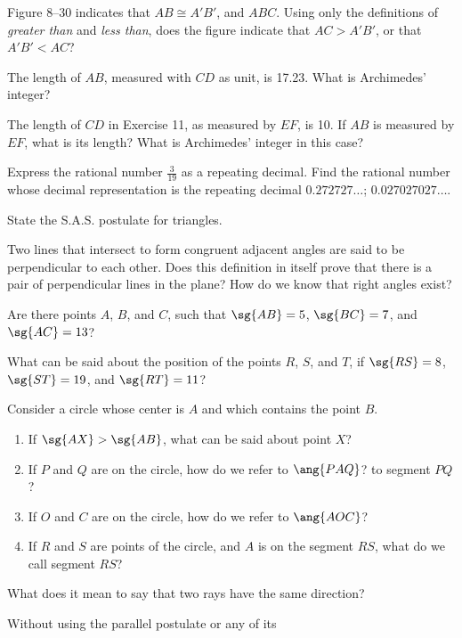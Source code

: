 \documentclass[11pt]{book}
\theoremstyle{bkplain}
\theoremstyle{XIplainnote}
\theoremstyle{bkplain}
\theoremstyle{bkplain}
\begin{document}
\begin{exlist}
\item[10.] Figure 8--30 indicates that $AB \cong A'B'$, and $ABC$. Using only
  the definitions of \emph{greater than} and \emph{less than}, does the figure
  indicate that $AC > A'B'$, or that $A'B' < AC$?
\exfig{\FIGVIIITHIRTY}
\item[11.] The length of $AB$, measured with $CD$ as unit, is 17.23. What is
  Archimedes' integer?
\item[12.] The length of $CD$ in Exercise 11, as measured by $EF$, is 10. If
  $AB$ is measured by $EF$, what is its length? What is Archimedes' integer in
  this case?
\item[13.] Express the rational number $\tfrac{3}{19}$ as a repeating decimal.
  Find the rational number whose decimal representation is the repeating
  decimal $0.272727\ldots$; $0.027027027\ldots$.
\item[14.] State the S.A.S. postulate for triangles.
\item[15.] Two lines that intersect to form congruent adjacent angles are said
  to be perpendicular to each other. Does this definition in itself prove that
  there is a pair of perpendicular lines in the plane? How do we know that
  right angles exist?
\item[16.] Are there points $A$, $B$, and $C$, such that $\sg{AB} = 5$,
  $\sg{BC} = 7$, and $\sg{AC} = 13$?
\item[17.] What can be said about the position of the points $R$, $S$, and
  $T$, if $\sg{RS} = 8$, $\sg{ST} = 19$, and $\sg{RT} = 11$?
\item[18.] Consider a circle whose center is $A$ and which contains the point
  $B$.
  \begin{enumerate}[label=(\alph*), leftmargin=1.8em, topsep=2pt, itemsep=1pt]
    \item If $\sg{AX} > \sg{AB}$, what can be said about point $X$?
    \item If $P$ and $Q$ are on the circle, how do we refer to $\ang{PAQ}$? to
      segment $PQ$?
    \item If $O$ and $C$ are on the circle, how do we refer to $\ang{AOC}$?
    \item If $R$ and $S$ are points of the circle, and $A$ is on the segment
      $RS$, what do we call segment $RS$?
  \end{enumerate}
\item[19.] What does it mean to say that two rays have the same direction?
\item[\stex 20.] Without using the parallel postulate or any of its

\end{exlist}
\end{document}
